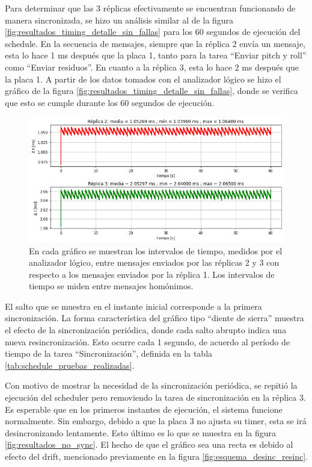 Para determinar que las 3 réplicas efectivamente se encuentran funcionando de manera sincronizada, se hizo un análisis similar al de la figura \ref{fig:resultados_timing_detalle_sin_fallas} para los 60 segundos de ejecución del schedule. En la secuencia de mensajes, siempre que la réplica 2 envía un mensaje, esta lo hace 1 ms después que la placa 1, tanto para la tarea ``Enviar pitch y roll'' como ``Enviar residuos''. En cuanto a la réplica 3, esta lo hace 2 ms después que la placa 1. A partir de los datos tomados con el analizador lógico se hizo el gráfico de la figura \ref{fig:resultados_timing_detalle_sin_fallas}, donde se verifica que esto se cumple durante los 60 segundos de ejecución.

\begin{figure}[H]
    \centering
    \includegraphics[width=\textwidth]{img/resultados_sincronizacion_sin_fallas.png}
    \caption{En cada gráfico se muestran los intervalos de tiempo, medidos por el analizador lógico, entre mensajes enviados por las réplicas 2 y 3 con respecto a los mensajes enviados por la réplica 1. Los intervalos de tiempo se miden entre mensajes homónimos.}
    \label{fig:resultados_sincronizacion_sin_fallas}
\end{figure}

El salto que se muestra en el instante inicial corresponde a la primera sincronización. La forma característica del gráfico tipo ``diente de sierra'' muestra el efecto de la sincronización periódica, donde cada salto abrupto indica una nueva resincronización. Esto ocurre cada 1 segundo, de acuerdo al período de tiempo de la tarea ``Sincronización'', definida en la tabla \ref{tab:schedule_pruebas_realizadas}.

Con motivo de mostrar la necesidad de la sincronización periódica, se repitió la ejecución del scheduler pero removiendo la tarea de sincronización en la réplica 3. Es esperable que en los primeros instantes de ejecución, el sistema funcione normalmente. Sin embargo, debido a que la placa 3 no ajusta su timer, esta se irá desincronizando lentamente. Esto último es lo que se muestra en la figura \ref{fig:resultados_no_sync}. El hecho de que el gráfico sea una recta es debido al efecto del drift, mencionado previamente en la figura \ref{fig:esquema_desinc_resinc}. 

